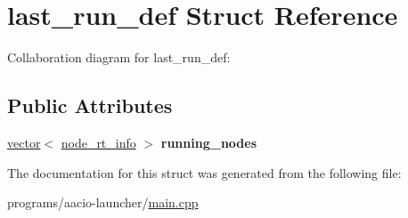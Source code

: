 \hypertarget{structlast__run__def}{}\section{last\+\_\+run\+\_\+def Struct Reference}
\label{structlast__run__def}


Collaboration diagram for last\+\_\+run\+\_\+def\+:
\subsection*{Public Attributes}
\begin{DoxyCompactItemize}
\item 
\mbox{\label{structlast__run__def_ad25116cc478f9d873f2ecd2d31b4e9fd}} 
\mbox{\hyperlink{classstd_1_1vector}{vector}}$<$ \mbox{\hyperlink{structnode__rt__info}{node\+\_\+rt\+\_\+info}} $>$ {\bfseries running\+\_\+nodes}
\end{DoxyCompactItemize}


The documentation for this struct was generated from the following file\+:\begin{DoxyCompactItemize}
\item 
programs/aacio-\/launcher/\mbox{\hyperlink{programs_2aacio-launcher_2main_8cpp}{main.\+cpp}}\end{DoxyCompactItemize}
